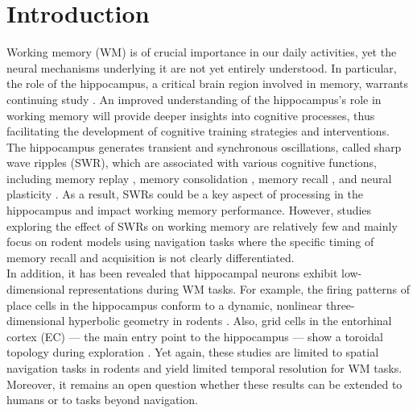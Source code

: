 \section{Introduction}
Working memory (WM) is of crucial importance in our daily activities, yet the neural mechanisms underlying it are not yet entirely understood. In particular, the role of the hippocampus, a critical brain region involved in memory, warrants continuing study \cite{scoville_loss_1957,squire_legacy_2009,boran_persistent_2019,kaminski_persistently_2017,kornblith_persistent_2017,faraut_dataset_2018,borders_hippocampus_2022,li_functional_2023,dimakopoulos_information_2022}. An improved understanding of the hippocampus's role in working memory will provide deeper insights into cognitive processes, thus facilitating the development of cognitive training strategies and interventions.
\\
\indent
The hippocampus generates transient and synchronous oscillations, called sharp wave ripples (SWR), which are associated with various cognitive functions, including memory replay \cite{wilson_reactivation_1994,nadasdy_replay_1999,lee_memory_2002,davidson_hippocampal_2009}, memory consolidation \cite{girardeau_selective_2009,ego-stengel_disruption_2010,fernandez-ruiz_long-duration_2019,kim_corticalhippocampal_2022}, memory recall \cite{wu_hippocampal_2017,norman_hippocampal_2019,norman_hippocampal_2021}, and neural plasticity \cite{behrens_induction_2005,norimoto_hippocampal_2018}. As a result, SWRs could be a key aspect of processing in the hippocampus and impact working memory performance. However, studies exploring the effect of SWRs on working memory are relatively few \cite{jadhav_awake_2012} and mainly focus on rodent models using navigation tasks where the specific timing of memory recall and acquisition is not clearly differentiated.
\\
\indent
In addition, it has been revealed that hippocampal neurons exhibit low-dimensional representations during WM tasks. For example, the firing patterns of place cells \cite{okeefe_hippocampus_1971,okeefe_place_1976,ekstrom_cellular_2003,kjelstrup_finite_2008,harvey_intracellular_2009,royer_control_2012} in the hippocampus conform to a dynamic, nonlinear three-dimensional hyperbolic geometry in rodents \cite{zhang_hippocampal_2022}. Also, grid cells in the entorhinal cortex (EC) — the main entry point to the hippocampus \cite{naber_reciprocal_2001,van_strien_anatomy_2009,strange_functional_2014}— show a toroidal topology during exploration \cite{gardner_toroidal_2022}. Yet again, these studies are limited to spatial navigation tasks in rodents and yield limited temporal resolution for WM tasks. Moreover, it remains an open question whether these results can be extended to humans or to tasks beyond navigation.
